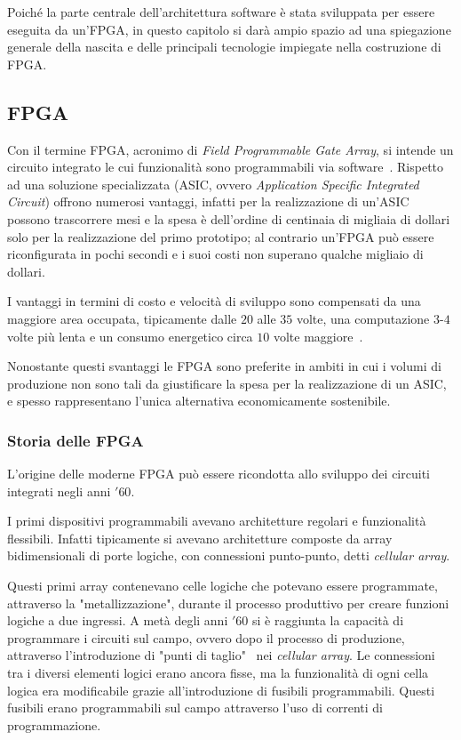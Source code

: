 Poiché la parte centrale dell'architettura software è stata sviluppata per essere eseguita da un'FPGA, in questo capitolo si darà ampio spazio ad una spiegazione generale della nascita e delle principali tecnologie impiegate nella costruzione di FPGA.

\subsection{FPGA}
Con il termine FPGA, acronimo di \textit{Field Programmable Gate Array}, si intende un circuito integrato le cui funzionalità sono programmabili via software~\cite{Kuon:2008:FAS:1454695.1454696}. Rispetto ad una soluzione specializzata (ASIC, ovvero \textit{Application Specific Integrated Circuit}) offrono numerosi vantaggi, infatti per la realizzazione di un'ASIC possono trascorrere mesi e la spesa è dell'ordine di centinaia di migliaia di dollari solo per la realizzazione del primo prototipo; al contrario un'FPGA può essere riconfigurata in pochi secondi e i suoi costi non superano qualche migliaio di dollari.

I vantaggi in termini di costo e velocità di sviluppo sono compensati da una maggiore area occupata, tipicamente dalle $20$ alle $35$ volte, una computazione $3$-$4$ volte più lenta e un consumo energetico circa $10$ volte maggiore~\cite{4068926}.

Nonostante questi svantaggi le FPGA sono preferite in ambiti in cui i volumi di produzione non sono tali da giustificare la spesa per la realizzazione di un ASIC, e spesso rappresentano l'unica alternativa economicamente sostenibile.

\subsubsection{Storia delle FPGA}
L'origine delle moderne FPGA può essere ricondotta allo sviluppo dei circuiti integrati negli anni $'60$. 

I primi dispositivi programmabili avevano architetture regolari e funzionalità flessibili. Infatti tipicamente si avevano architetture composte da array bidimensionali di porte logiche, con connessioni punto-punto, detti \textit{cellular array}.

Questi primi array contenevano celle logiche che potevano essere programmate, attraverso la "metallizzazione", durante il processo produttivo per creare funzioni logiche a due ingressi. A metà degli anni $'60$ si è raggiunta la capacità di programmare i circuiti sul campo, ovvero dopo il processo di produzione, attraverso l'introduzione di "punti di taglio"~\cite{Minnick:1967:SMR:321386.321387} nei \textit{cellular array}. Le connessioni tra i diversi elementi logici erano ancora fisse, ma la funzionalità di ogni cella logica era modificabile grazie all'introduzione di fusibili programmabili. Questi fusibili erano programmabili sul campo attraverso l'uso di correnti di programmazione.

